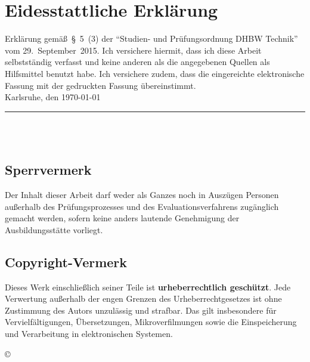 \chapter*{Eidesstattliche Erklärung}

Erklärung gemäß~§~5~(3) der "`Studien- und Prüfungsordnung DHBW Technik"' vom 29.~September~2015. Ich versichere hiermit, dass ich diese Arbeit selbstständig verfasst und keine anderen als die angegebenen Quellen als Hilfsmittel benutzt habe. Ich versichere zudem, dass die eingereichte elektronische Fassung mit der gedruckten Fassung übereinstimmt.\\[2ex]

\noindent Karlsruhe, den \today \\[6ex]
\noindent \rule{5cm}{0.5pt} \\
\noindent \autor\\[1ex]

\section*{Sperrvermerk}

Der Inhalt dieser Arbeit darf weder als Ganzes noch in Auszügen Personen außerhalb des Prüfungsprozesses und des Evaluationsverfahrens zugänglich gemacht werden, sofern keine anders lautende Genehmigung der Ausbildungsstätte vorliegt.

\section*{Copyright-Vermerk}

Dieses Werk einschließlich seiner Teile ist \textbf{urheberrechtlich geschützt}. Jede Verwertung außerhalb der engen Grenzen des Urheberrechtgesetzes ist ohne Zustimmung des Autors unzulässig und strafbar. Das gilt insbesondere für Vervielfältigungen, Übersetzungen, Mikroverfilmungen sowie die Einspeicherung und Verarbeitung in elektronischen Systemen.

\begin{flushright}
    \copyright{} \jahr
\end{flushright}

\clearpage